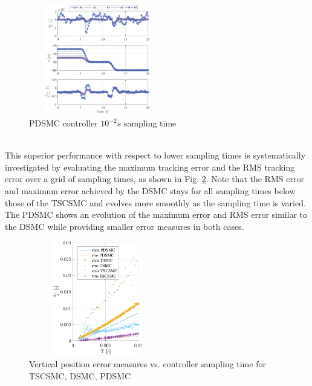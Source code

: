 \documentclass{ifacconf}
\newcommand{\figheight}{4.8cm}
\newcommand{\figwidth}{6cm}
\begin{document}
\begin{figure}[h!]
\begin{center}
\includegraphics[width=\figwidth,height=\figheight]{PDSMC-100Hz-TIMESCALESEPARATION-turbulence=1}    %
\caption{ PDSMC controller $10^{-2} s$ sampling time}
\label{fig:PDSMC100Hz}
\end{center}
\end{figure}\\
This superior performance with respect to lower sampling times is systematically investigated by evaluating the maximum tracking error and the RMS tracking error over a grid of sampling times, as shown in Fig. \ref{fig:errorvssamplingtime}. Note that the RMS error and maximum error achieved by the DSMC stays for all sampling times below those of the TSCSMC and evolves more smoothly as the sampling time is varied. The PDSMC shows an evolution of the maximum error and RMS error similar to the DSMC while providing smaller error measures in both cases.\\
\begin{figure}[h!]
\begin{center}
\includegraphics[width=6cm,height=5cm]{error-z-vs-samplingtime.pdf}    %
\caption{Vertical position error measures vs. controller sampling time for TSCSMC, DSMC, PDSMC}
\label{fig:errorvssamplingtime}
\end{center}
\end{figure}
\end{document}
